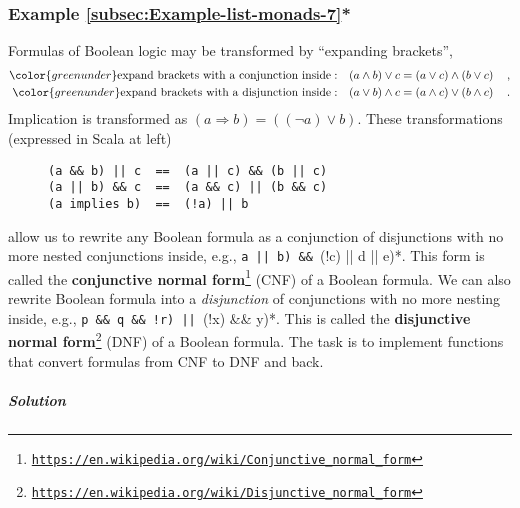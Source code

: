 \subsubsection{Example \label{subsec:Example-list-monads-7}\ref{subsec:Example-list-monads-7}{*}}

Formulas of Boolean logic may be transformed by \textsf{``}expanding brackets\textsf{''},
\begin{align*}
{\color{greenunder}\text{expand brackets with a conjunction inside}:}\quad & (a\wedge b)\vee c=\left(a\vee c\right)\wedge\left(b\vee c\right)\quad,\\
{\color{greenunder}\text{expand brackets with a disjunction inside}:}\quad & (a\vee b)\wedge c=\left(a\wedge c\right)\vee\left(b\wedge c\right)\quad.
\end{align*}
Implication is transformed as $(a\Rightarrow b)=((\neg a)\vee b)$.
These transformations (expressed in Scala at left)

\begin{wrapfigure}{l}{0.4\columnwidth}%
\vspace{-0.6\baselineskip}
\begin{lstlisting}
(a && b) || c  ==  (a || c) && (b || c)
(a || b) && c  ==  (a && c) || (b && c)
(a implies b)  ==  (!a) || b
\end{lstlisting}
\vspace{-0.8\baselineskip}
\end{wrapfigure}%

\noindent allow us to rewrite any Boolean formula as a conjunction
of disjunctions with no more nested conjunctions inside, e.g., \lstinline*(a || b) && ((!c) || d || e)*.
This form is called the \textbf{conjunctive normal form}\footnote{\texttt{\href{https://en.wikipedia.org/wiki/Conjunctive_normal_form}{https://en.wikipedia.org/wiki/Conjunctive\_normal\_form}}}
(CNF) of a Boolean formula. We can also rewrite Boolean formula into
a \emph{disjunction} of conjunctions with no more nesting inside,
e.g., \lstinline*(p && q && !r) || ((!x) && y)*. This is called the
\textbf{disjunctive normal form}\footnote{\texttt{\href{https://en.wikipedia.org/wiki/Disjunctive_normal_form}{https://en.wikipedia.org/wiki/Disjunctive\_normal\_form}}}
(DNF) of a Boolean formula. The task is to implement functions that
convert formulas from CNF to DNF and back. 

\subparagraph{Solution}

